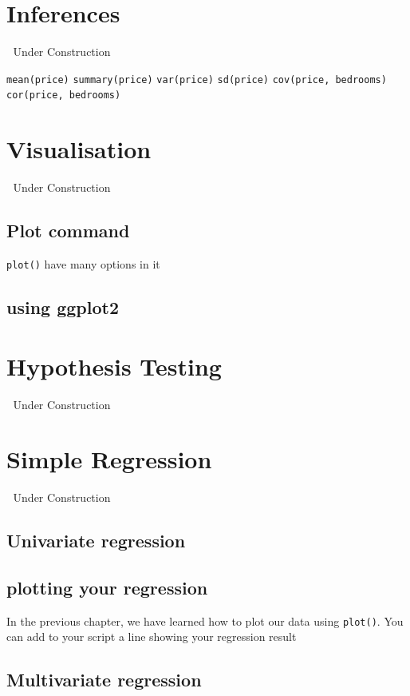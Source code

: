 \documentclass[
]{book}
\begin{document}
\hypertarget{inferences}{%
\chapter{Inferences}\label{inferences}}

🚧 Under Construction 🚧

\texttt{mean(price)}
\texttt{summary(price)}
\texttt{var(price)}
\texttt{sd(price)}
\texttt{cov(price,\ bedrooms)}
\texttt{cor(price,\ bedrooms)}

\hypertarget{visualisation}{%
\chapter{Visualisation}\label{visualisation}}

🚧 Under Construction 🚧

\hypertarget{plot-command}{%
\section{Plot command}\label{plot-command}}

\texttt{plot()} have many options in it

\hypertarget{using-ggplot2}{%
\section{using ggplot2}\label{using-ggplot2}}

\hypertarget{hypothesis-testing}{%
\chapter{Hypothesis Testing}\label{hypothesis-testing}}

🚧 Under Construction 🚧

\hypertarget{simple-regression}{%
\chapter{Simple Regression}\label{simple-regression}}

🚧 Under Construction 🚧

\hypertarget{univariate-regression}{%
\section{Univariate regression}\label{univariate-regression}}

\hypertarget{plotting-your-regression}{%
\section{plotting your regression}\label{plotting-your-regression}}

In the previous chapter, we have learned how to plot our data using \texttt{plot()}. You can add to your script a line showing your regression result

\hypertarget{multivariate-regression}{%
\section{Multivariate regression}\label{multivariate-regression}}

  
\end{document}
